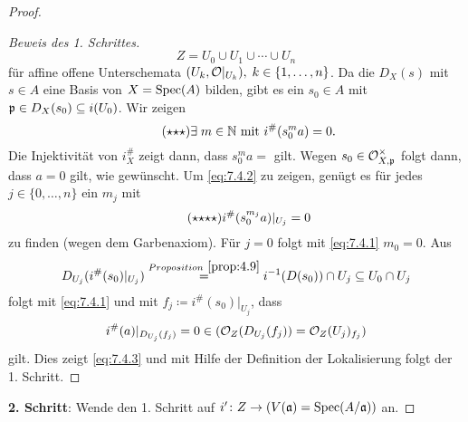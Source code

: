 \begin{thm}
\begin{proof}
\begin{proof}[Beweis des 1. Schrittes]
			\[
				Z = U_0 \cup U_1 \cup \cdots \cup U_n
			\]
			für affine offene Unterschemata $(U_k,\mathcal{O}\vert_{U_k}),\; k \in \{1,\ldots,n\}$. Da die $D_X(s)$ mit $s \in A$ eine Basis von $X = \operatorname{Spec}(A)$ bilden, gibt es ein $s_0\in A$ mit $\mathfrak{p} \in D_X(s_0) \subseteq i(U_0)$. Wir zeigen
			\begin{equation*}
			\label{eq:7.4.2}\tag{$\star{\star}\star$}
				\exists\; m \in \N \text{ mit } i^{\#}(s_0^ma) = 0.
			\end{equation*}
			Die Injektivität von $i^{\#}_X$ zeigt dann, dass $s_0^ma =$ gilt. Wegen $s_0\in \mathcal{O}_{X,\mathfrak{p}}^\times$ folgt dann, dass $a = 0$ gilt, wie gewünscht. Um \eqref{eq:7.4.2} zu zeigen, genügt es für jedes $j \in \{0,\ldots,n\}$ ein $m_j$ mit
			\begin{equation*}
			\label{eq:7.4.3}\tag{$\star{\star}{\star}\star$}
				i^{\#}(s_0^{m_j}a)\vert_{U_j} = 0
			\end{equation*}
			zu finden (wegen dem Garbenaxiom). Für $j=0$ folgt mit \eqref{eq:7.4.1} $m_0=0$. Aus
			\[
				D_{U_j}(i^{\#}(s_0)\vert_{U_j}) \overset{Proposition~\ref{prop:4.9}}{=} i^{-1}(D(s_0)) \cap U_j \subseteq U_0 \cap U_j
			\]
			folgt mit \eqref{eq:7.4.1} und mit $f_j \coloneqq i^{\#}(s_0)\vert_{U_j}$, dass
			\[
				i^{\#}(a)\vert_{D_{U_j}(f_j)} = 0 \in (\mathcal{O}_Z(D_{U_j}(f_j)) = \mathcal{O}_Z(U_j)_{f_j})
			\]
			gilt. Dies zeigt \eqref{eq:7.4.3} und mit Hilfe der Definition der Lokalisierung folgt der 1. Schritt.
		\end{proof}
		\textbf{2. Schritt}: Wende den 1. Schritt auf $i'\colon Z \to (V(\mathfrak{a}) = \operatorname{Spec}(A/\mathfrak{a}))$ an.
	\end{proof}
\end{thm}

